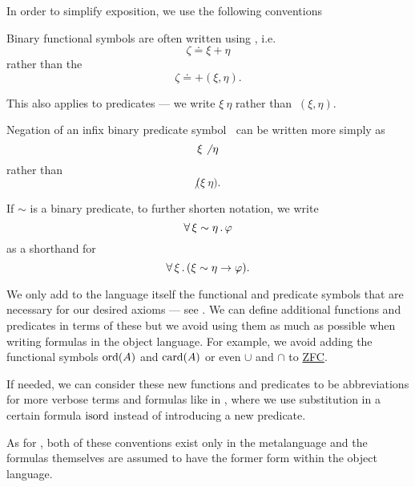 \begin{remark}\label{rem:first_order_formula_conventions}
  In order to simplify exposition, we use the following conventions
  \begin{thmenum}
     Binary functional symbols are often written using , i.e.
    \begin{equation*}
      \zeta \doteq \xi + \eta
    \end{equation*}
    rather than the 
    \begin{equation*}
      \zeta \doteq +(\xi, \eta).
    \end{equation*}

    This also applies to predicates --- we write \( \xi ~ \eta \) rather than \( ~(\xi, \eta) \).

     Negation of an infix binary predicate symbol \( ~ \) can be written more simply as
    \begin{equation*}
      \xi \not~ \eta
    \end{equation*}
    rather than
    \begin{equation*}
      \not(\xi ~ \eta).
    \end{equation*}

     If \( \sim \) is a binary predicate, to further shorten notation, we write
    \begin{equation*}
      \forall \thinspace \xi \sim \eta \thinspace . \thinspace \varphi
    \end{equation*}
    as a shorthand for
    \begin{equation*}
      \forall \thinspace \xi \thinspace . \thinspace (\xi \sim \eta \rightarrow \varphi).
    \end{equation*}

     We only add to the language itself the functional and predicate symbols that are necessary for our desired axioms --- see . We can define additional functions and predicates in terms of these but we avoid using them as much as possible when writing formulas in the object language. For example, we avoid adding the functional symbols \hyperref[thm:order_type_existence]{\( \operatorname{ord}(A) \)} and \hyperref[def:cardinal]{\( \operatorname{card}(A) \)} or even \hyperref[def:set_union]{\( \cup \)} and \hyperref[def:set_intersection]{\( \cap \)} to \hyperref[def:zfc]{ZFC}.

    If needed, we can consider these new functions and predicates to be abbreviations for more verbose terms and formulas like in , where we use substitution in a certain formula \( \operatorname{isord} \) instead of introducing a new predicate.
  \end{thmenum}

  As for , both of these conventions exist only in the metalanguage and the formulas themselves are assumed to have the former form within the object language.
\end{remark}

